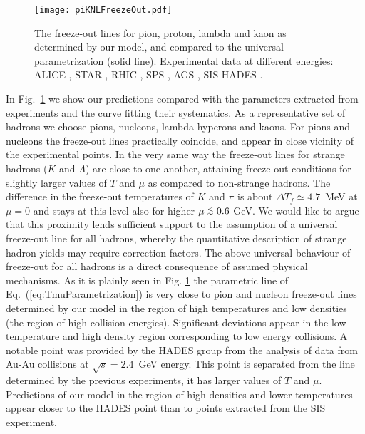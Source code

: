 \documentclass[12pt]{article}
\begin{document}
\begin{figure}[h]
	\begin{center}
	\texttt{[image: piKNLFreezeOut.pdf]}
	\caption{The freeze-out lines for pion, proton, lambda and kaon as determined by our model,
	 and compared to the universal parametrization \cite{Cleymans:2005xv} (solid line).
	 Experimental data at different energies: ALICE \cite{Floris:2014pta},  STAR \cite{Adamczyk:2017iwn,Adams:2005dq},
	 RHIC \cite{BraunMunzinger:2001ip,Cleymans:2004pp}, SPS \cite{Becattini:2005xt,Becattini:2003wp,Bravina:2002wz},
	 AGS \cite{Becattini:2005xt,Becattini:2003wp,Bravina:2002wz}, SIS \cite{Cleymans:1998yb,Averbeck:2000sn}
	 HADES \cite{HADES}.
	}
	\label{fig:freezeout}
	\end{center}
\end{figure}


In Fig.~\ref{fig:freezeout} we show our predictions compared with the parameters extracted from experiments and the curve fitting their systematics.
As a representative set of hadrons we choose pions, nucleons, lambda hyperons and kaons.
For pions and nucleons the freeze-out lines %
practically coincide, and appear in close vicinity  of the experimental points.
In the very same way the freeze-out lines for strange hadrons ($K$ and $\Lambda$)
are close to one another,  attaining freeze-out conditions for slightly larger values of $T$ and $\mu$ as compared to non-strange hadrons. 
The difference in the freeze-out temperatures of $K$ and $\pi$ is about $\Delta T_f\simeq4.7$~MeV at 
$\mu=0$ and stays at this level also for higher $\mu \lsim 0.6$ GeV.
We would like to argue that this proximity lends sufficient support to the assumption of a universal freeze-out line for all hadrons, whereby the quantitative description of strange hadron yields may require correction factors. 
The above universal behaviour of freeze-out for all hadrons is a direct consequence of assumed physical
mechanisms. 
As it is plainly seen in Fig. \ref{fig:freezeout} the parametric line of Eq.~(\ref{eq:TmuParametrization})
is very close to pion and nucleon freeze-out lines determined by our model in the region of high 
temperatures and low densities (the region of high collision energies). 
Significant deviations appear in the low temperature and high density region corresponding to
low energy collisions. 
A notable point was provided by the HADES group \cite{HADES} from the analysis of data from 
Au-Au collisions at $\sqrt{s}=2.4$~GeV energy. 
This point is separated from the line determined by the previous experiments, it has larger values of  $T$ and $\mu$. 
Predictions of our model in the region of high densities and lower temperatures appear closer to the HADES point than to points extracted from the SIS experiment.
\end{document}
